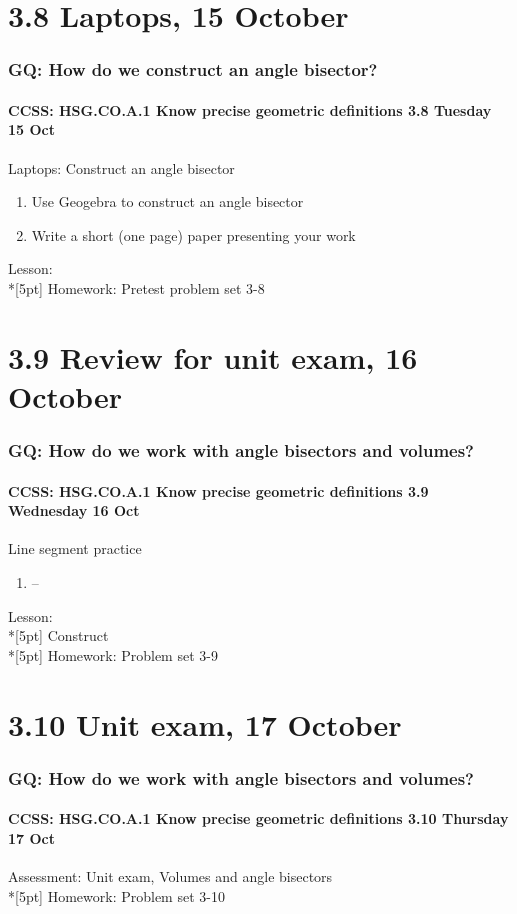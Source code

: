 \documentclass{beamer}
\begin{document}
  \section{3.8 Laptops, 15 October}
    \frame
    {
      \frametitle{GQ: How do we construct an angle bisector?}
      \framesubtitle{CCSS: HSG.CO.A.1 Know precise geometric definitions \hfill \alert{3.8 Tuesday 15 Oct}}

      \begin{block}{Laptops: Construct an angle bisector}
      \begin{enumerate}
        \item Use Geogebra to construct an angle bisector
        \item Write a short (one page) paper presenting your work
      \end{enumerate}
      \end{block}
      Lesson:   \\*[5pt]
      Homework: Pretest problem set 3-8
    }

\section{3.9 Review for unit exam, 16 October}
  \frame
  {
    \frametitle{GQ: How do we work with angle bisectors and volumes?}
    \framesubtitle{CCSS: HSG.CO.A.1 Know precise geometric definitions \hfill \alert{3.9 Wednesday 16 Oct}}

    \begin{block}{Line segment practice}
    \begin{enumerate}
      \item --
    \end{enumerate}
    \end{block}
    Lesson:   \\*[5pt]
    Construct\\*[5pt]
    Homework: Problem set 3-9
  }

\section{3.10 Unit exam, 17 October}
    \frame
    {
      \frametitle{GQ: How do we work with angle bisectors and volumes?}
      \framesubtitle{CCSS: HSG.CO.A.1 Know precise geometric definitions \hfill \alert{3.10 Thursday 17 Oct}}

      Assessment: Unit exam, Volumes and angle bisectors\\*[5pt]
      Homework: Problem set 3-10
    }
\end{document}
